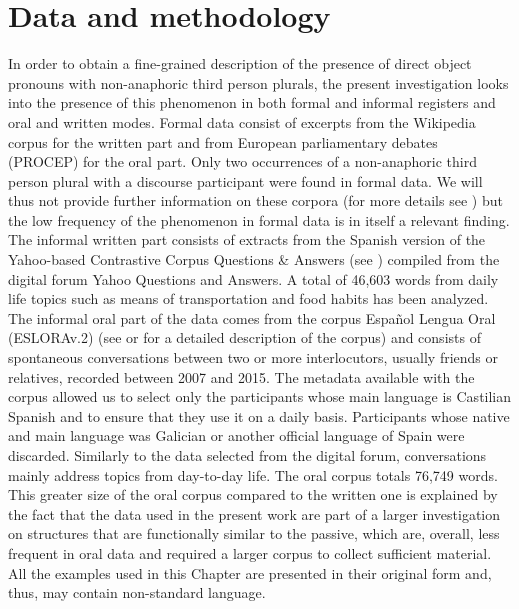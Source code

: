 \documentclass[output=paper]{langscibook}
\begin{document}
\section{Data and methodology}\label{sec:pierre:2}

In order to obtain a fine-grained description of the presence of direct object pronouns with non-anaphoric third person plurals, the present investigation looks into the presence of this phenomenon in both formal and informal registers and oral and written modes. Formal data consist of excerpts from the Wikipedia corpus \citep{ReeseRigau2010} for the written part and from European parliamentary debates (PROCEP) for the oral part. Only two occurrences of a non-anaphoric third person plural with a discourse participant were found in formal data. We will thus not provide further information on these corpora (for more details see \citealt[74--78]{Pierre2021}) but the low frequency of the phenomenon in formal data is in itself a relevant finding. The informal written part consists of extracts from the Spanish version of the Yahoo-based Contrastive Corpus Questions \& Answers (see \citealt{DeSmet2009}) compiled from the digital forum Yahoo Questions and Answers. A total of 46,603 words from daily life topics such as means of transportation and food habits has been analyzed. The informal oral part of the data comes from the corpus Español Lengua Oral (ESLORAv.2) (see \citealt{BarcalaVillapol2018} or  \citealt{VázquezRozasEtAl2020} for a detailed description of the corpus) and consists of spontaneous conversations between two or more interlocutors, usually friends or relatives, recorded between 2007 and 2015. The metadata available with the corpus allowed us to select only the participants whose main language is Castilian Spanish and to ensure that they use it on a daily basis. Participants whose native and main language was Galician or another official language of Spain were discarded. Similarly to the data selected from the digital forum, conversations mainly address topics from day-to-day life. The oral corpus totals 76,749 words. This greater size of the oral corpus compared to the written one is explained by the fact that the data used in the present work are part of a larger investigation on structures that are functionally similar to the passive, which are, overall, less frequent in oral data \citep[80]{Pierre2021} and required a larger corpus to collect sufficient material. All the examples used in this Chapter are presented in their original form and, thus, may contain non-standard language.
\end{document}
